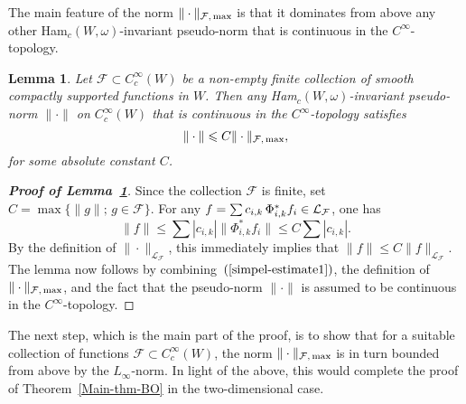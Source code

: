 \documentclass{icmart}
\newtheorem{lemma}[theorem]{Lemma}
\theoremstyle{definition}
\begin{document}
The main feature of the norm $\| \cdot \|_{{\cal F}, \, {\rm max}}$ is %
that it dominates from above any other Ham$_c(W,\omega)$-invariant
pseudo-norm that is continuous in the
$C^{\infty}$-topology.  %
\begin{lemma} \label{lemma-about-max-norm}
Let ${\mathcal F} \subset C_c^{\infty}(W)$ be a non-empty finite
collection of smooth compactly supported functions in $W$. Then  any
{\rm Ham}$_c(W,\omega)$-invariant pseudo-norm $ \| \cdot \| $ on $
C_c^\infty(W) $ that is continuous in the $ C^\infty $-topology
satisfies $$ \| \cdot \| \leqslant C \| \cdot \|_{{\cal F}, \, {\rm max}},$$
for some absolute constant $C$.
\end{lemma}

\begin{proof}[\bf Proof of Lemma~\ref{lemma-about-max-norm}]
Since the collection ${\mathcal F}$ is finite, set $C = \max \{ \| g \|  ; \, g \in {\mathcal F} \}$. For any $f =
\sum c_{i,k} \, \Phi_{i,k}^*  f_i \in {\cal L}_{\mathcal F}$, one
has
\begin{equation} \label{simpel-estimate1}  \|f \| \leq   \sum |c_{i,k}| \| \Phi_{i,k}^* f_i \|  \leq  C \sum |c_{i,k}|. %
\end{equation}
By the definition of $\| \cdot \|_{{\mathcal L}_{{\mathcal F}}}$, this immediately implies that $\|f\| \leq  C  \| f \|_{{\mathcal L}_{{\mathcal F}}}$.
The lemma now follows by combining~$(\ref{simpel-estimate1})$, the
definition of  $ \| \cdot \|_{{\cal F}, \, {\rm max}} $, and the fact that
the pseudo-norm $ \| \cdot \| $ is assumed to be continuous in the $
C^\infty $-topology.
\end{proof}


\smallskip

The next step, which is the
main part of the proof, is to show that for a suitable collection of
functions ${\mathcal F} \subset C_c^{\infty}(W)$, the norm $\| \cdot
\|_{{\mathcal F}, \, {\rm max}}$ is in turn bounded from above by the
$L_{\infty}$-norm. %
In light of the above, this would complete the proof of Theorem~\ref{Main-thm-BO} in the two-dimensional case. 
%
%
%
%
%
\end{document}
